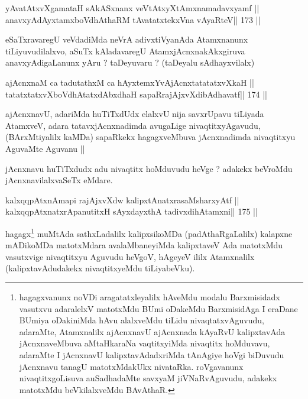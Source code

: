 \begin{shl}
yAvatAtxvXgamataH sAkASxnanx veVtAtxyXtAmxnamadavxyamf ||
anavxyAdAyxtamxboVdhAthaRM tAvatatxtekxVna vAyaRteV\hfill || 173 ||
\end{shl}

\begin{artha}
eSaTxravaregU veVdadiMda neVrA adivxtiVyanAda Atamxnanunx tiLiyuvudilalxvo, aSuTx kAladavaregU AtamxjAcnxnakAkxgiruva anavxyAdigaLanunx yAru ? taDeyuvaru ? (taDeyalu sAdhayxvilalx)
\end{artha}

\begin{shl}
ajAcnxnaM ca tadutathxM ca hAyxtemxYvAjAcnxtatatatxvXkaH ||
tatatxtatxvXboVdhAtatxdAbxdhaH sapaRrajAjxvXdibAdhavatf\hfill || 174 ||
\end{shl}

\begin{artha}
ajAcnxnavU, adariMda huTiTxdUdx elalxvU nija savxrUpavu tiLiyada AtamxveV, adara tatavxjAcnxnadimda avugaLige nivaqtitxyAgavudu, (BArxMtiyalilx kaMDa) sapaRkekx hagagxveMbuva jAcnxnadimda nivaqtitxyu AguvaMte Aguvanu ||
\end{artha}

\begin{artha}
jAcnxnavu huTiTxdudx adu nivaqtitx hoMduvudu heVge ? adakekx beVroMdu jAcnxnavilalxvaSeTx eMdare.
\end{artha}

\begin{shl}
kalxqqpAtxnAmapi rajAjxvXdw kalipxtAnatxrasaMsharxyAtf ||
kalxqqpAtxnatxrApanutitxH sAyxdayxthA tadivxdihA\s\s tamxni\hfill || 175 ||
\end{shl}

\begin{artha}
hagagx\footnote[12]{hagagxvanunx noVDi aragatatxleyalilx hAveMdu modalu Barxmisidadx vasutxvu adaralelxV matotxMdu BUmi oDakeMdu BarxmisidAga I eraDane BUmiya oDakiniMda hAvu alalxveMdu tiLidu nivaqtatxvAguvudu, adaraMte, Atamxnalilx ajAcnxnavU ajAcnxnada kAyaRvU kalipxtavAda jAcnxnaveMbuva aMtaHkaraNa vaqtitxyiMda nivaqtitx hoMduvavu, adaraMte I jAcnxnavU kalipxtavAdadxriMda tAnAgiye hoVgi biDuvudu jAcnxnavu tanagU matotxMdakUkx nivataRka. roVgavanunx nivaqtitxgoLisuva auSadhadaMte savxyaM jiVNaRvAguvudu, adakekx matotxMdu beVkilalxveMdu BAvAthaR.} muMtAda sathxLadalilx kalipxsikoMDa (padAthaRgaLalilx) kalapxne mADikoMDa matotxMdara avalaMbaneyiMda kalipxtaveV Ada matotxMdu vasutxvige nivaqtitxyu Aguvudu heVgoV, hAgeyeV ililx Atamxnalilx (kalipxtavAdudakekx nivaqtitxyeMdu tiLiyabeVku).
\end{artha}

